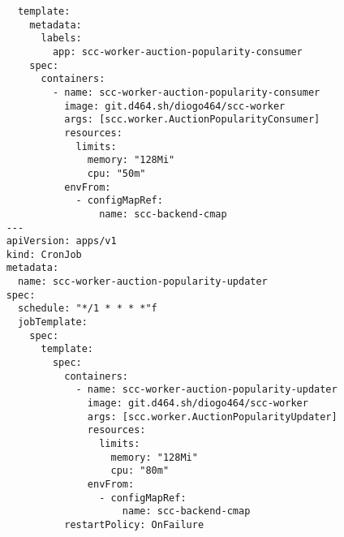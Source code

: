 \documentclass[runningheads]{llncs}
\begin{document}
\begin{verbatim}
      template:
        metadata:
          labels:
            app: scc-worker-auction-popularity-consumer
        spec:
          containers:
            - name: scc-worker-auction-popularity-consumer
              image: git.d464.sh/diogo464/scc-worker
              args: [scc.worker.AuctionPopularityConsumer]
              resources:
                limits:
                  memory: "128Mi"
                  cpu: "50m"
              envFrom:
                - configMapRef:
                    name: scc-backend-cmap
    ---
    apiVersion: apps/v1
    kind: CronJob
    metadata:
      name: scc-worker-auction-popularity-updater
    spec:
      schedule: "*/1 * * * *"f
      jobTemplate:
        spec:
          template:
            spec:
              containers:
                - name: scc-worker-auction-popularity-updater
                  image: git.d464.sh/diogo464/scc-worker
                  args: [scc.worker.AuctionPopularityUpdater]
                  resources:
                    limits:
                      memory: "128Mi"
                      cpu: "80m"
                  envFrom:
                    - configMapRef:
                        name: scc-backend-cmap
              restartPolicy: OnFailure
\end{verbatim}
\end{document}
